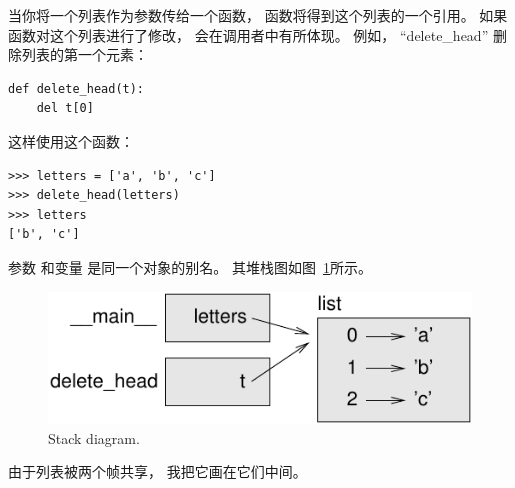   
  


当你将一个列表作为参数传给一个函数， 函数将得到这个列表的一个引用。  如果函数对这个列表进行了修改， 会在调用者中有所体现。  例如， ``delete\_head'' 删除列表的第一个元素：

\begin{lstlisting}
def delete_head(t):
    del t[0]
\end{lstlisting}

%

这样使用这个函数：

\begin{lstlisting}
>>> letters = ['a', 'b', 'c']
>>> delete_head(letters)
>>> letters
['b', 'c']
\end{lstlisting}

%

参数  和变量  是同一个对象的别名。
其堆栈图如图~\ref{fig.stack5}所示。

  

\begin{figure}
\centerline
{\includegraphics[scale=0.8]{../source/figs/stack5.pdf}}
\caption{Stack diagram.}
\label{fig.stack5}
\end{figure}


由于列表被两个帧共享， 我把它画在它们中间。


